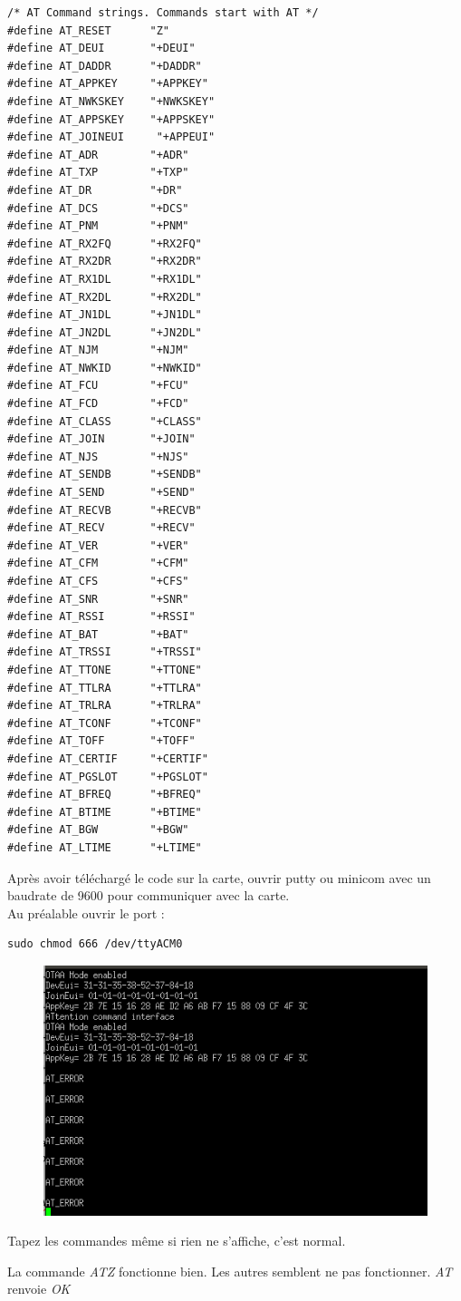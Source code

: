 \documentclass{article}
\begin{document}
\begin{verbatim}
/* AT Command strings. Commands start with AT */
#define AT_RESET      "Z"
#define AT_DEUI       "+DEUI"
#define AT_DADDR      "+DADDR"
#define AT_APPKEY     "+APPKEY"
#define AT_NWKSKEY    "+NWKSKEY"
#define AT_APPSKEY    "+APPSKEY"
#define AT_JOINEUI     "+APPEUI" 
#define AT_ADR        "+ADR"
#define AT_TXP        "+TXP"
#define AT_DR         "+DR"
#define AT_DCS        "+DCS"
#define AT_PNM        "+PNM"
#define AT_RX2FQ      "+RX2FQ"
#define AT_RX2DR      "+RX2DR"
#define AT_RX1DL      "+RX1DL"
#define AT_RX2DL      "+RX2DL"
#define AT_JN1DL      "+JN1DL"
#define AT_JN2DL      "+JN2DL"
#define AT_NJM        "+NJM"
#define AT_NWKID      "+NWKID"
#define AT_FCU        "+FCU"
#define AT_FCD        "+FCD"
#define AT_CLASS      "+CLASS"
#define AT_JOIN       "+JOIN"
#define AT_NJS        "+NJS"
#define AT_SENDB      "+SENDB"
#define AT_SEND       "+SEND"
#define AT_RECVB      "+RECVB"
#define AT_RECV       "+RECV"
#define AT_VER        "+VER"
#define AT_CFM        "+CFM"
#define AT_CFS        "+CFS"
#define AT_SNR        "+SNR"
#define AT_RSSI       "+RSSI"
#define AT_BAT        "+BAT"
#define AT_TRSSI      "+TRSSI"
#define AT_TTONE      "+TTONE"
#define AT_TTLRA      "+TTLRA"
#define AT_TRLRA      "+TRLRA"
#define AT_TCONF      "+TCONF"
#define AT_TOFF       "+TOFF"
#define AT_CERTIF     "+CERTIF"
#define AT_PGSLOT     "+PGSLOT" 
#define AT_BFREQ      "+BFREQ"
#define AT_BTIME      "+BTIME"
#define AT_BGW        "+BGW" 
#define AT_LTIME      "+LTIME" 
\end{verbatim}

Après avoir téléchargé le code sur la carte, ouvrir putty ou minicom avec un baudrate de 9600 pour communiquer avec la carte. \\
Au préalable ouvrir le port : 

\begin{verbatim}
sudo chmod 666 /dev/ttyACM0
\end{verbatim}

\begin{figure}[H]
\begin{center}
\advance\leftskip-3cm
\advance\rightskip-3cm
\includegraphics[keepaspectratio=true,scale=0.6]{putty.png}
\label{visina8}
\end{center}\end{figure}

Tapez les commandes même si rien ne s'affiche, c'est normal.

La commande \textit{ATZ} fonctionne bien.
Les autres semblent ne pas fonctionner.
\textit{AT} renvoie \textit{OK}
\end{document}
